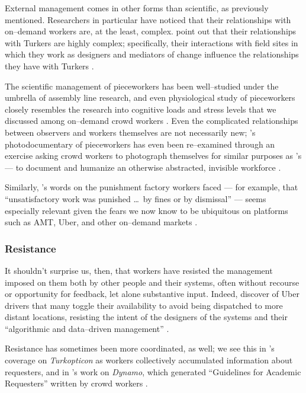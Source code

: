 \documentclass[trackingWork]{subfiles}
\begin{document}
{External management comes in other forms than scientific, as previously mentioned.
Researchers in particular have noticed that their relationships with on--demand workers are,
at the least, complex.
\citeauthor{storiesIraniSilberman} point out that their relationships with Turkers are highly complex;
specifically, their interactions with field sites in which they work
as designers and mediators of change influence the relationships they have with Turkers
\cite{storiesIraniSilberman}.

The scientific management of pieceworkers has been well--studied under the umbrella of assembly line research,
and even physiological study of pieceworkers closely resembles the
research into cognitive loads and stress levels that we discussed among on--demand crowd workers
\cite{hu1961parallel,pieceworkBiologicalHarm}.
Even the complicated relationships between observers and workers themselves are not necessarily new;
\citeauthor{riisOtherSideLives}'s photodocumentary of pieceworkers has even been re--examined through an exercise asking crowd workers
to photograph themselves for similar purposes as \citeauthor{riisOtherSideLives}'s --- to document and humanize an otherwise abstracted, invisible workforce
\cite{facesOfMechanicalTurk,turkopticon,riisOtherSideLives}.

Similarly, \citeauthor{pollard1963factory}'s words on the punishment factory workers faced ---
for example, that ``unsatisfactory work was punished \dots~by fines or by dismissal'' ---
seems especially relevant given the fears we now know to be ubiquitous on platforms such as AMT, Uber, and other on--demand markets
\cite{pollard1963factory,uberAlgorithm,dynamo,turkopticon,takingAHITMcInnis}.

\subsubsection{Resistance}
It shouldn't surprise us, then, that workers have resisted the management imposed on them both by other people and their systems,
often without recourse or opportunity for feedback, let alone substantive input.
Indeed, \citeauthor{uberAlgorithm} discover of Uber drivers that 
many toggle their availability to avoid being dispatched to more distant locations,
resisting the intent of the designers of the systems and their ``algorithmic and data--driven management''
\cite{uberAlgorithm}.

Resistance has sometimes been more coordinated, as well;
we see this in \citeauthor{turkopticon}'s coverage on \textit{Turkopticon} as workers collectively accumulated information about requesters, and
in \citeauthor{dynamo}'s work on \textit{Dynamo}, which generated ``Guidelines for Academic Requesters'' written by crowd workers
\cite{turkopticon,dynamo}.

}
\end{document}
